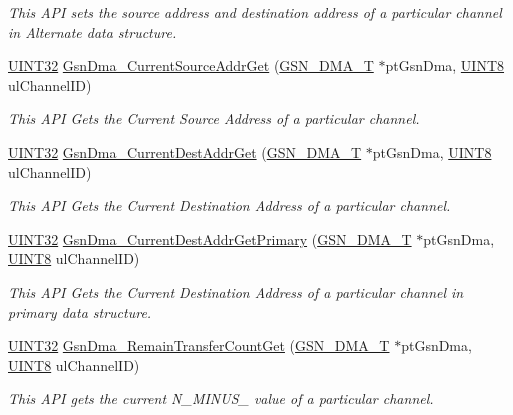 \begin{DoxyCompactItemize}
\begin{DoxyCompactList}\small\item\em This API sets the source address and destination address of a particular channel in Alternate data structure. \end{DoxyCompactList}\item 
\hyperlink{a00660_gae1e6edbbc26d6fbc71a90190d0266018}{UINT32} \hyperlink{a00645_ga19ae102a0c571013f52c40ca8f7829f4}{GsnDma\_\-CurrentSourceAddrGet} (\hyperlink{a00049}{GSN\_\-DMA\_\-T} $\ast$ptGsnDma, \hyperlink{a00660_gab27e9918b538ce9d8ca692479b375b6a}{UINT8} ulChannelID)
\begin{DoxyCompactList}\small\item\em This API Gets the Current Source Address of a particular channel. \end{DoxyCompactList}\item 
\hyperlink{a00660_gae1e6edbbc26d6fbc71a90190d0266018}{UINT32} \hyperlink{a00645_gaf793f914fc28383eb27b9f4697df3627}{GsnDma\_\-CurrentDestAddrGet} (\hyperlink{a00049}{GSN\_\-DMA\_\-T} $\ast$ptGsnDma, \hyperlink{a00660_gab27e9918b538ce9d8ca692479b375b6a}{UINT8} ulChannelID)
\begin{DoxyCompactList}\small\item\em This API Gets the Current Destination Address of a particular channel. \end{DoxyCompactList}\item 
\hyperlink{a00660_gae1e6edbbc26d6fbc71a90190d0266018}{UINT32} \hyperlink{a00645_ga4041bdc9579ac5a6544a433217b33ec2}{GsnDma\_\-CurrentDestAddrGetPrimary} (\hyperlink{a00049}{GSN\_\-DMA\_\-T} $\ast$ptGsnDma, \hyperlink{a00660_gab27e9918b538ce9d8ca692479b375b6a}{UINT8} ulChannelID)
\begin{DoxyCompactList}\small\item\em This API Gets the Current Destination Address of a particular channel in primary data structure. \end{DoxyCompactList}\item 
\hyperlink{a00660_gae1e6edbbc26d6fbc71a90190d0266018}{UINT32} \hyperlink{a00645_ga471064b999c9fbe35dae71e46ca0d6be}{GsnDma\_\-RemainTransferCountGet} (\hyperlink{a00049}{GSN\_\-DMA\_\-T} $\ast$ptGsnDma, \hyperlink{a00660_gab27e9918b538ce9d8ca692479b375b6a}{UINT8} ulChannelID)
\begin{DoxyCompactList}\small\item\em This API gets the current N\_\-MINUS\_ value of a particular channel. \end{DoxyCompactList}\item 

\end{DoxyCompactItemize}
